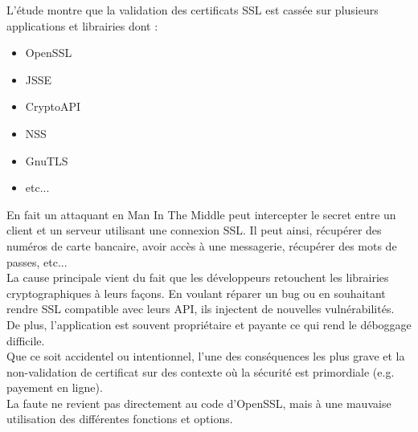 			L'étude montre que la validation des certificats SSL est cassée sur plusieurs applications et librairies dont :
			\begin{itemize}
			\item OpenSSL
			\item JSSE
			\item CryptoAPI
			\item NSS
			\item GnuTLS
			\item etc...\\
			\end{itemize} 
			
			En fait un attaquant en Man In The Middle peut intercepter le secret entre un client et un serveur utilisant une connexion SSL. Il peut ainsi, récupérer des numéros de carte bancaire, avoir accès à une messagerie, récupérer des mots de passes, etc...\\
			
			La cause principale vient du fait que les développeurs retouchent les librairies cryptographiques à leurs façons. En voulant réparer un bug ou en souhaitant rendre SSL compatible avec leurs API, ils injectent de nouvelles vulnérabilités.\\
			De plus, l'application est souvent propriétaire et payante ce qui rend le déboggage difficile.\\
			
			Que ce soit accidentel ou intentionnel, l'une des conséquences les plus grave et la non-validation de certificat sur des contexte où la sécurité est primordiale (e.g. payement en ligne).\\
			
			La faute ne revient pas directement au code d'OpenSSL, mais à une mauvaise utilisation des différentes fonctions et options.\\
			

